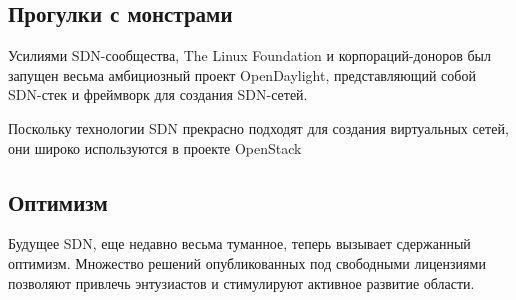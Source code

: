 \documentclass[10pt, a5paper]{article}
\begin{document}
\subsection*{Прогулки с монстрами}

Усилиями SDN-сообщества, The Linux Foundation и корпораций-доноров был запущен весьма амбициозный проект OpenDaylight, представляющий собой SDN-стек и фреймворк для создания SDN-сетей.

Поскольку технологии SDN прекрасно подходят для создания виртуальных сетей, они широко используются в проекте OpenStack

\subsection*{Оптимизм}

Будущее SDN, еще недавно весьма туманное, теперь вызывает сдержанный оптимизм. Множество решений опубликованных под свободными лицензиями позволяют привлечь энтузиастов и стимулируют активное развитие области.
\end{document}
